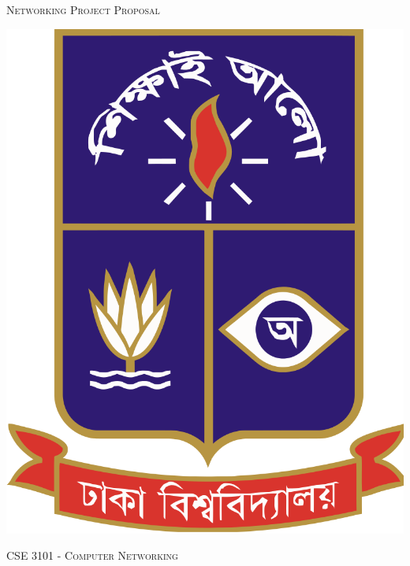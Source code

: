 \documentclass[11pt]{article}
\begin{document}
\begin{titlepage}
    \begin{center}
     \begin{Huge}
            \textsc{Networking Project Proposal}\par \vspace{0.5cm}
        \end{Huge}
        \includegraphics[scale=0.10]{du.png}\par\vspace{0.5cm}
        \begin{Huge}
            \textsc{CSE 3101 - Computer Networking}\par{}
        \end{Huge}
        \begin{Large}
            

\end{Large}
\end{center}
\end{titlepage}
\end{document}

